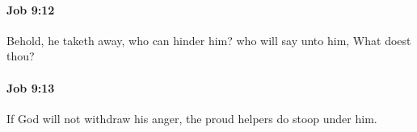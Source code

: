 		\paragraph{Job 9:12} %
			\label{JOB-9-12}

			Behold, he taketh away, who can hinder him? who will say unto him, What doest thou?


		\paragraph{Job 9:13} %
			\label{JOB-9-13}

			If God will not withdraw his anger, the proud helpers do stoop under him.


